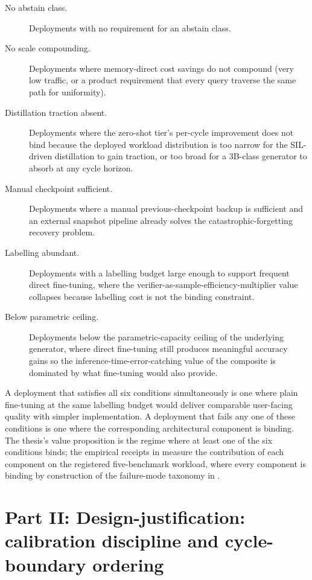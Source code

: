 \begin{description}
\item[No abstain class.] Deployments with no requirement for an abstain class.
\item[No scale compounding.] Deployments where memory-direct cost savings do not compound (very low traffic, or a product requirement that every query traverse the same path for uniformity).
\item[Distillation traction absent.] Deployments where the zero-shot tier's per-cycle improvement does not bind because the deployed workload distribution is too narrow for the SIL-driven distillation to gain traction, or too broad for a 3B-class generator to absorb at any cycle horizon.
\item[Manual checkpoint sufficient.] Deployments where a manual previous-checkpoint backup is sufficient and an external snapshot pipeline already solves the catastrophic-forgetting recovery problem.
\item[Labelling abundant.] Deployments with a labelling budget large enough to support frequent direct fine-tuning, where the verifier-as-sample-efficiency-multiplier value collapses because labelling cost is not the binding constraint.
\item[Below parametric ceiling.] Deployments below the parametric-capacity ceiling of the underlying generator, where direct fine-tuning still produces meaningful accuracy gains so the inference-time-error-catching value of the composite is dominated by what fine-tuning would also provide.
\end{description}

A deployment that satisfies all six conditions simultaneously is one where plain fine-tuning at the same labelling budget would deliver comparable user-facing quality with simpler implementation. A deployment that fails any one of these conditions is one where the corresponding architectural component is binding. The thesis's value proposition is the regime where at least one of the six conditions binds; the empirical receipts in  measure the contribution of each component on the registered five-benchmark workload, where every component is binding by construction of the failure-mode taxonomy in .

\part*{Part II: Design-justification: calibration discipline and cycle-boundary ordering}

